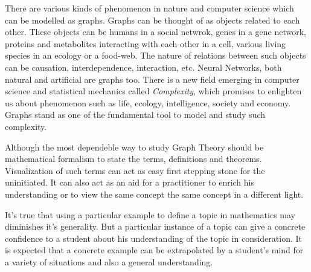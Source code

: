 There are various kinds of phenomenon in nature and computer science which can
be modelled as graphs. Graphs can be thought of as objects related to each
other. These objects can be humans in a social netwrok, genes in a gene
network, proteins and metabolites interacting with each other in a cell,
various living species in an ecology or a food-web. The nature of relations
between such objects can be causation, interdependence, interaction, etc.
Neural Networks, both natural and artificial are graphs too. There is a new
field emerging in computer science and statistical mechanics called
\emph{Complexity}, which promises to enlighten us about phenomenon such as
life, ecology, intelligence, society and economy. Graphs stand as one of the
fundamental tool to model and study such complexity.


Although the most dependeble way to study Graph Theory should be mathematical
formalism to state the terms, definitions and theorems. Visualization of such
terms can act as easy first stepping stone for the uninitiated. It can also act
as an aid for a practitioner to enrich his understanding or to view the same
concept the same concept in a different light.

It's true that using a particular example to define a topic in mathematics may
diminishes it's generality. But a particular instance of a topic can
give a concrete confidence to a student about his understanding of the
topic in consideration. It is expected that a concrete example can be
extrapolated by a student's mind for a variety of situations and also a
general understanding.




%
